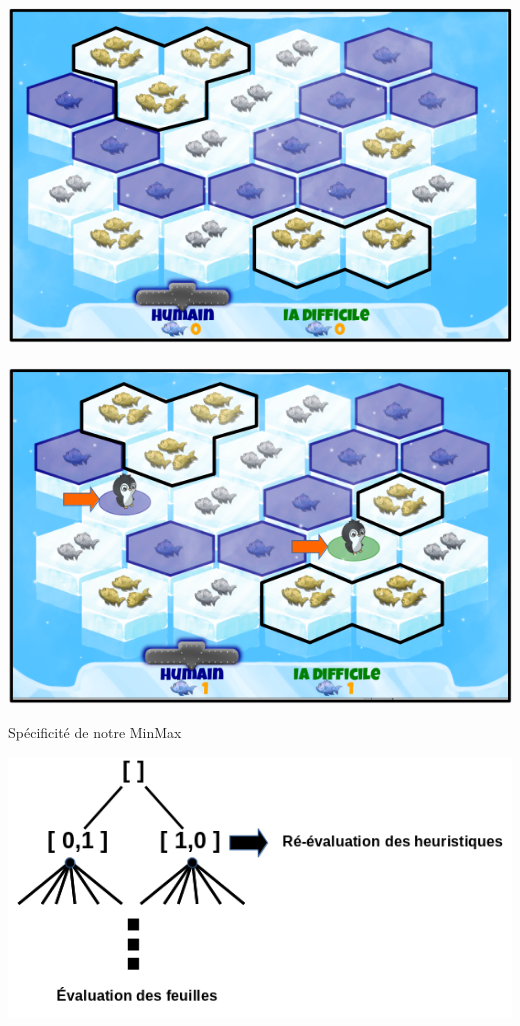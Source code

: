 \documentclass{beamer}
\begin{document}
\begin{frame}{}
\begin{center}
\includegraphics[scale=0.2]{IA1}\hspace*{0.5cm}~%
\pause
\includegraphics[scale=0.2]{IA2}
\end{center}
\end{frame}

\begin{frame}{}
\begin{block}{Spécificité de notre MinMax}
\begin{center}
  \includegraphics[scale=0.4]{IA4}
\end{center}
\end{block}
\end{frame}
\end{document}
